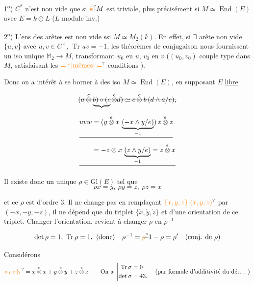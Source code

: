 1\textsuperscript{o}) $C^*$  n'est non vide que si $\deleted{\unsure{k}}M$ est triviale, plus précisément si $M\simeq\operatorname{End}(E)$ avec $E=k\oplus L$ ($L$ module inv.)

 2\textsuperscript{o})  L'ens des arêtes est non vide ssi $M\simeq M_2(k)$. En effet, si $\exists$ arête non vide $\{u,v\}$  avec $u,v\in C^\times$, $\operatorname{Tr}uv=-1$, les théorèmes de conjugaison nous fournissent un iso unique $\mathbb M_2\longrightarrow M$, transformant $u_0$ en $u$, $v_0$ en $v$ ($(u_0,v_0)$ couple type dans $M$, satisfaisant les $\unsure{={}^s|\text{mêmes}|=}$ conditions ).

Donc on a intérêt à se borner  à des iso $M\simeq\operatorname{End}(E)$, en supposant $E$ \uline{libre}

\[
 \deleted{(a\overset{e}{\otimes}\underbrace{b)\circ(c}\overset{e}{\otimes}d)
 \simeq c\overset{e}{\otimes}b\,(d\wedge a/e),}
\]

\[
\begin{aligned}
 &\deleted{uvw=(y\overset{e}{\otimes}x\,\underbrace{(-x\wedge y/e)}_{-1})\,z\overset{e}{\otimes}z}\\
 &\deleted{\phantom{uvw}=-z\otimes x\,\underbrace{(z\wedge y/e)}_{-1}=z\overset{e}{\otimes}x}
\end{aligned}
\]

Il existe donc un unique $\rho\in\mathrm{Gl}(E)$ tel que
\[
 \rho x=y,\ \rho y=z,\ \rho z=x
\]

et ce $\rho$ est d'ordre 3. Il ne change pas en remplaçant $\unsure{\{x,y,z\}|(x,y,z)}$ par $(-x,-y,-z)$, il ne dépend que du triplet $\{\dot{x},\dot{y},\dot{z}\}$ et d'une orientation de ce triplet. Changer l'orientation, revient à changer $\rho$ en $\rho^{-1}$

\[
 \det\rho=1,\ \operatorname{Tr}\rho=1,\ \inserted{\text{donc}}\quad
 \rho^{-1}=\deleted{\unsure{\rho}}1-\rho=\rho'\quad(\text{conj. de }\rho)
\]

Considérons
\[
 \unsure{\sigma_f|\sigma|\tau} =x\overset{e}{\otimes}x+y\overset{e}{\otimes}y+z\overset{e}{\otimes}z
 \qquad\text{On a }\left|\begin{aligned}
 \operatorname{Tr}\sigma&=0\\
 \det\sigma&=\deleted{4}3.
 \end{aligned}\right.\quad
 \text{(par formule d'additivité du dét\ldots)}
\]

